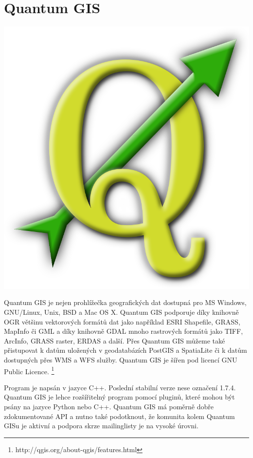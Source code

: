 \section{Quantum GIS}

\nocite{qgis:www}

\begin{center}
	\includegraphics[scale=0.1]{pictures/qgis_logo}
\end{center}

Quantum GIS je nejen prohlížečka geografických dat dostupná pro MS Windows, GNU/Linux, Unix, BSD a Mac OS X. Quantum GIS podporuje díky knihovně OGR většinu vektorových formátů dat jako například ESRI Shapefile, GRASS, MapInfo či GML a díky knihovně  GDAL mnoho rastrových formátů jako TIFF, ArcInfo, GRASS raster, ERDAS a další. Přes Quantum GIS můžeme také přistupovat k datům uložených v geodatabázích PostGIS a SpatiaLite či k datům dostupných přes WMS a WFS služby. Quantum GIS je šířen pod licencí GNU Public Licence. \footnote{http://qgis.org/about-qgis/features.html}

Program je napsán v jazyce C++. Poslední stabilní verze nese označení 1.7.4. Quantum GIS je lehce rozšířitelný program pomocí pluginů, které mohou být psány na jazyce Python nebo C++. Quantum GIS má poměrně dobře zdokumentované API a nutno také podotknout, že komunita kolem Quantum GISu je aktivní a podpora skrze mailinglisty je na vysoké úrovni.

